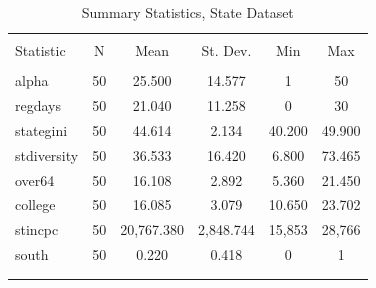 \documentclass[12pt]{article}
\begin{document}
\begin{table}[!htbp] \centering 
  \caption{Summary Statistics, State Dataset} 
  \label{T:sum} 
\begin{tabular}{@{\extracolsep{5pt}}lccccc} 
\\[-1.8ex]\hline 
\hline \\[-1.8ex] 
Statistic & \multicolumn{1}{c}{N} & \multicolumn{1}{c}{Mean} & \multicolumn{1}{c}{St. Dev.} & \multicolumn{1}{c}{Min} & \multicolumn{1}{c}{Max} \\ 
\hline \\[-1.8ex] 
alpha & 50 & 25.500 & 14.577 & 1 & 50 \\ 
regdays & 50 & 21.040 & 11.258 & 0 & 30 \\ 
stategini & 50 & 44.614 & 2.134 & 40.200 & 49.900 \\ 
stdiversity & 50 & 36.533 & 16.420 & 6.800 & 73.465 \\ 
over64 & 50 & 16.108 & 2.892 & 5.360 & 21.450 \\ 
college & 50 & 16.085 & 3.079 & 10.650 & 23.702 \\ 
stincpc & 50 & 20,767.380 & 2,848.744 & 15,853 & 28,766 \\ 
south & 50 & 0.220 & 0.418 & 0 & 1 \\ 
\hline \\[-1.8ex] 
\normalsize 
\end{tabular} 
\end{table} 
\end{document}
